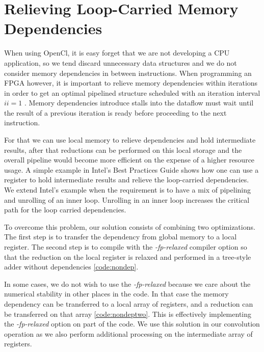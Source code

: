 \section{Relieving Loop-Carried Memory Dependencies}

When using OpenCl, it is easy forget that we are not developing a CPU application, so we tend discard unnecessary data structures and we do not consider memory dependencies in between instructions. When programming an FPGA however, it is important to relieve memory dependencies within iterations in order to get an optimal pipelined structure scheduled with an iteration interval $ ii=1 $ . Memory dependencies introduce stalls into the dataflow must wait until the result of a previous iteration is ready before proceeding to the next instruction. 

For that we can use local memory to relieve dependencies and hold intermediate results, after that reductions can be performed on this local storage and the overall pipeline would become more efficient on the expense of a higher resource usage. A simple example in Intel's Best Practices Guide \cite{intelsdk} shows how one can use a register to hold intermediate results and relieve the loop-carried dependencies. We extend Intel's example when the requirement is to have a mix of pipelining and unrolling of an inner loop. Unrolling in an inner loop increases the critical path for the loop carried dependencies. 

To overcome this problem, our solution consists of combining two optimizations. The first step is to transfer the dependency from global memory to a local register. The second step is to compile with the \emph{-fp-relaxed} compiler option so that the reduction on the local register is relaxed and performed in a tree-style adder without dependencies \ref{code:nondep}. 

\newpage

 \label{code:dep}   
  
 \label{code:nondep} 

In some cases, we do not wish to use the \emph{-fp-relaxed} because we care about the numerical stability in other places in the code. In that case the memory dependency can be transferred to a local array of registers, and a reduction can be transferred on that array \ref{code:nondeptwo}. This is effectively implementing the \emph{-fp-relaxed} option on part of the code. We use this solution in our convolution operation as we also perform additional processing on the intermediate array of registers.

